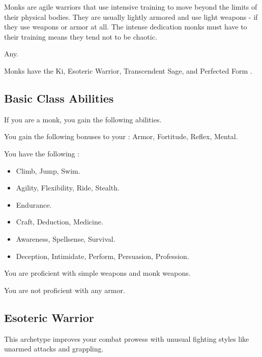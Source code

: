     Monks are agile warriors that use intensive training to move beyond the limits of their physical bodies.
    They are usually lightly armored and use light weapons - if they use weapons or armor at all.
    The intense dedication monks must have to their training means they tend not to be chaotic.

     Any.

     Monks have the Ki, Esoteric Warrior, Transcendent Sage, and Perfected Form .

    \subsection{Basic Class Abilities}
        If you are a monk, you gain the following abilities.

        You gain the following bonuses to your :  Armor,  Fortitude,  Reflex,  Mental.

        You have the following :
        \begin{itemize}
            \item {} Climb, Jump, Swim.
            \item {} Agility, Flexibility, Ride, Stealth.
            \item {} Endurance.
            \item {} Craft, Deduction, Medicine.
            \item {} Awareness, Spellsense, Survival.
            \item {} Deception, Intimidate, Perform, Persuasion, Profession.
        \end{itemize}

        You are proficient with simple weapons and monk weapons.

        You are not proficient with any armor.

    \subsection{Esoteric Warrior}\label{Esoteric Warrior}
        This archetype improves your combat prowess with unusual fighting styles like unarmed attacks and grappling.

